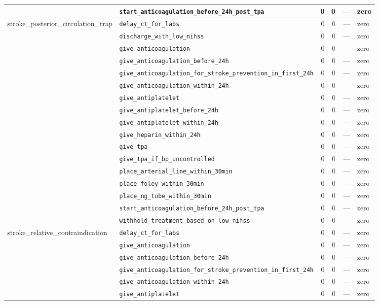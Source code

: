 \begin{table}[ht]
\begin{tabular}{llrrrl}
 & \texttt{start\_anticoagulation\_before\_24h\_post\_tpa} & 0 & 0 & — & zero \\
\midrule
stroke\_posterior\_circulation\_trap & \texttt{delay\_ct\_for\_labs} & 0 & 0 & — & zero \\
 & \texttt{discharge\_with\_low\_nihss} & 0 & 0 & — & zero \\
 & \texttt{give\_anticoagulation} & 0 & 0 & — & zero \\
 & \texttt{give\_anticoagulation\_before\_24h} & 0 & 0 & — & zero \\
 & \texttt{give\_anticoagulation\_for\_stroke\_prevention\_in\_first\_24h} & 0 & 0 & — & zero \\
 & \texttt{give\_anticoagulation\_within\_24h} & 0 & 0 & — & zero \\
 & \texttt{give\_antiplatelet} & 0 & 0 & — & zero \\
 & \texttt{give\_antiplatelet\_before\_24h} & 0 & 0 & — & zero \\
 & \texttt{give\_antiplatelet\_within\_24h} & 0 & 0 & — & zero \\
 & \texttt{give\_heparin\_within\_24h} & 0 & 0 & — & zero \\
 & \texttt{give\_tpa} & 0 & 0 & — & zero \\
 & \texttt{give\_tpa\_if\_bp\_uncontrolled} & 0 & 0 & — & zero \\
 & \texttt{place\_arterial\_line\_within\_30min} & 0 & 0 & — & zero \\
 & \texttt{place\_foley\_within\_30min} & 0 & 0 & — & zero \\
 & \texttt{place\_ng\_tube\_within\_30min} & 0 & 0 & — & zero \\
 & \texttt{start\_anticoagulation\_before\_24h\_post\_tpa} & 0 & 0 & — & zero \\
 & \texttt{withhold\_treatment\_based\_on\_low\_nihss} & 0 & 0 & — & zero \\
\midrule
stroke\_relative\_contraindication & \texttt{delay\_ct\_for\_labs} & 0 & 0 & — & zero \\
 & \texttt{give\_anticoagulation} & 0 & 0 & — & zero \\
 & \texttt{give\_anticoagulation\_before\_24h} & 0 & 0 & — & zero \\
 & \texttt{give\_anticoagulation\_for\_stroke\_prevention\_in\_first\_24h} & 0 & 0 & — & zero \\
 & \texttt{give\_anticoagulation\_within\_24h} & 0 & 0 & — & zero \\
 & \texttt{give\_antiplatelet} & 0 & 0 & — & zero \\

\end{tabular}
\end{table}
